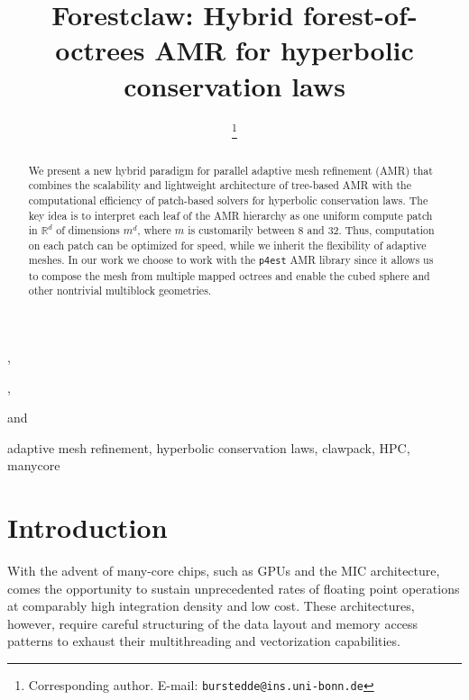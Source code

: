 \documentclass{IOS-Book-Article}     %
\newcommand{\sR}{\mathbb{R}}
\newcommand{\forestclaw}{Forestclaw\xspace}
\newcommand{\pforest}{\texttt{p4est}\xspace}
\begin{document}
\begin{frontmatter}          %
%
\title{\forestclaw:
        Hybrid forest-of-octrees AMR for hyperbolic conservation laws}
\runningtitle{\forestclaw}

%
\author[A]{ %
\thanks{Corresponding author.  E-mail: \texttt{burstedde@ins.uni-bonn.de}}},
\author[B]{ },
\author[C]{ } and
\author[C]{ }
\address[A]{Institut f\"ur Numerische Simulation, Universit\"at Bonn, Germany}
\address[B]{Boise State University, Idaho, USA}
\address[C]{Institute for Computational Engineering and Sciences,\\
The University of Texas at Austin, USA}

\begin{abstract}
%
We present a new hybrid paradigm for parallel adaptive mesh refinement (AMR)
that combines the scalability and lightweight architecture of tree-based AMR
with the computational efficiency of patch-based solvers for hyperbolic
conservation laws.  The key idea is to interpret each leaf of the AMR hierarchy
as one uniform compute patch in $\sR^d$ of dimensions $m^d$, where $m$ is
customarily between 8 and 32.  Thus, computation on each patch can be optimized
for speed, while we inherit the flexibility of adaptive meshes.  In our work we
choose to work with the \pforest AMR library since it allows us to compose the mesh
from multiple mapped octrees and enable the cubed sphere and other
nontrivial multiblock geometries.
%
\end{abstract}

\begin{keyword}
adaptive mesh refinement,
hyperbolic conservation laws,
clawpack,
HPC,
manycore
\end{keyword}

\end{frontmatter}


\section{Introduction}

With the advent of many-core chips, such as GPUs and the MIC architecture, comes the opportunity to sustain unprecedented rates of floating point
operations at comparably high integration density and low cost.  These
architectures, however, require careful structuring of the data layout and
memory access patterns to exhaust their multithreading and vectorization
capabilities.
\end{document}
